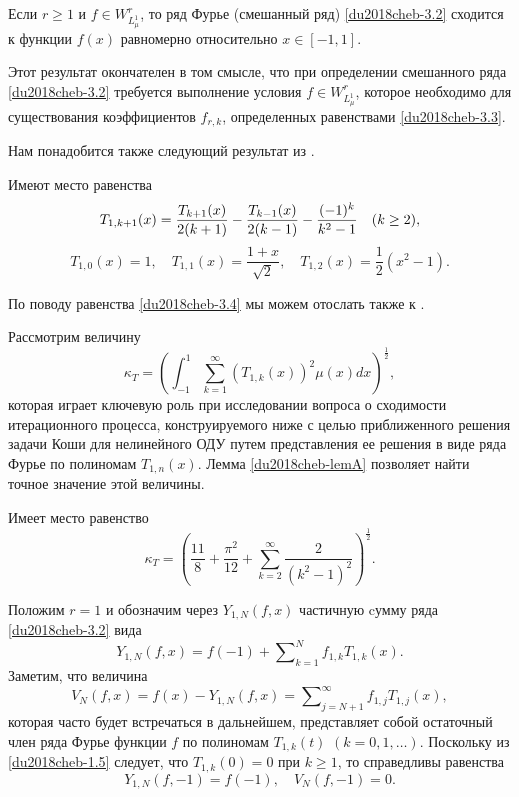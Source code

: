 \begin{theorem}\label{du2018cheb-thD}
	Если $r\ge1$ и  $f\in W^r_{L^1_\mu}$, то ряд Фурье (смешанный ряд) \eqref{du2018cheb-3.2} сходится к функции $f(x)$ равномерно относительно $x\in[-1,1]$.
\end{theorem}
Этот результат окончателен в том смысле, что при определении смешанного ряда \eqref{du2018cheb-3.2} требуется выполнение условия $f\in W^r_{L^1_\mu}$, которое необходимо для существования коэффициентов $f_{r,k}$, определенных равенствами \eqref{du2018cheb-3.3}.

Нам понадобится также следующий результат из \cite{SharIzv2018}.
\begin{lemma}\label{du2018cheb-lemA}
	Имеют место равенства
	\begin{equation}\label{du2018cheb-3.4}
	T_{1,k+1}(x)={T_{k+1}(x)\over2(k+1)}- {T_{k-1}(x)\over2(k-1)} -\frac{(-1)^k}{k^2-1}\quad (k\ge 2),
	\end{equation}
	\begin{equation}\label{du2018cheb-3.5}
	T_{1,0}(x)=1, \quad T_{1,1}(x)=\frac{1+x}{\sqrt{2}}, \quad T_{1,2}(x)=\frac12(x^2-1).
	\end{equation}
\end{lemma}
По поводу равенства \eqref{du2018cheb-3.4} мы можем отослать также к  \cite{Pash}.

Рассмотрим величину
\begin{equation}\label{du2018cheb-3.6}
\kappa_T=\left(\int_{-1}^1\sum_{k=1}^{\infty}(T_{1,k}(x))^2\mu(x)dx\right)^{\frac12},
\end{equation}
которая играет ключевую роль при исследовании вопроса о  сходимости итерационного процесса, конструируемого ниже с целью приближенного решения задачи Коши для    нелинейного ОДУ путем представления ее решения в виде ряда Фурье по полиномам $T_{1,n}(x)$. Лемма \ref{du2018cheb-lemA} позволяет найти точное значение этой величины.
\begin{theorem}\label{du2018cheb-th1}
	Имеет место равенство
	$$
	\kappa_ T=\left(\frac{11}{8}+\frac{\pi^2}{12}+\sum_{k=2}^\infty\frac{2}{(k^2-1)^2}\right)^\frac12.
	$$
\end{theorem}

Положим $r=1$ и обозначим через $Y_{1,N}(f,x)$ частичную cумму ряда \eqref{du2018cheb-3.2} вида
\begin{equation}\label{du2018cheb-3.12}
Y_{1,N}(f,x)= f(-1)+ \sum\nolimits_{k=1}^N  f_{1,k}T_{1,k}(x).
\end{equation}
Заметим,  что величина
\begin{equation}\label{du2018cheb-3.13}
V_N(f,x)=f(x)- Y_{1,N}(f,x)
=\sum\nolimits_{j=N+1}^\infty  f_{1,j}T_{1,j}(x),
\end{equation}
которая часто будет встречаться в дальнейшем,   представляет собой остаточный член ряда Фурье функции $f$ по полиномам $T_{1,k}(t)$ $(k=0,1,\ldots)$. Поскольку из \eqref{du2018cheb-1.5} следует, что $T_{1,k}(0)=0$ при $k\ge1$, то справедливы равенства
\begin{equation}\label{du2018cheb-3.14}
Y_{1,N}(f,-1)= f(-1),\quad V_N(f,-1)=0.
\end{equation}

